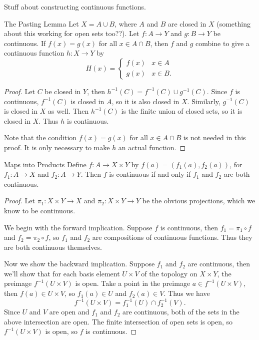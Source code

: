 \documentclass[10pt]{report}
\begin{document}
{\color{red}Stuff about constructing continuous functions.}

\begin{thrm}{The Pasting Lemma}{}
	Let $X = A \cup B$, where $A$ and $B$ are closed in $X$ {\color{red}(something about this working for open sets too??)}. Let $f:A \to Y$ and $g:B\to Y$ be continuous. If $f(x)=g(x)$ for all $x \in A \cap B$, then $f$ and $g$ combine to give a continuous function $h : X \to Y$ by
	\[
		H(x)=
		\begin{cases}
			f(x) & x \in A \\
			g(x) & x\in B.
		\end{cases}
	\] 
\end{thrm}
\begin{proof}
	Let $C$ be closed in $Y$, then $h^{-1}(C) = f^{-1}(C) \cup g^{-1}(C)$. Since $f$ is continuous, $f^{-1}(C)$ is closed in $A$, so it is also closed in $X$. Similarly, $g^{-1}(C)$ is closed in $X$ as well. Then $h^{-1}(C)$ is the finite union of closed sets, so it is closed in $X$. Thus $h$ is continuous.

	Note that the condition $f(x) = g(x)$ for all $x \in A \cap B$ is not needed in this proof. It is only necessary to make $h$ an actual function.
\end{proof}

\begin{thrm}{Maps into Products}{}
	Define $f:A\to X \times Y$ by $f(a)=(f_1(a), f_2(a))$, for $f_1:A\to X$ and $f_2:A\to Y$. Then $f$ is continuous if and only if $f_1$ and $f_2$ are both continuous.
\end{thrm}
\begin{proof}
	Let $\pi_1:X\times Y\to X$ and $\pi_2:X\times Y\to Y$ be the obvious projections, which we know to be continuous.

	We begin with the forward implication. Suppose $f$ is continuous, then $f_1=\pi_1 \circ f$ and $f_2=\pi_2 \circ f$, so $f_1$ and $f_2$ are compositions of continuous functions. Thus they are both continuous themselves.

	Now we show the backward implication. Suppose $f_1$ and $f_2$ are continuous, then we'll show that for each basis element $U \times V$ of the topology on $X \times Y$, the preimage $f^{-1}(U \times V)$ is open. Take a point in the preimage $a \in f^{-1}(U \times V)$, then $f(a) \in U \times V$, so $f_1(a) \in U$ and $f_2(a) \in V$. Thus we have
	\[
		f^{-1}(U \times V) = f_1^{-1}(U) \cap f_2^{-1}(V).
	\] Since $U$ and $V$ are open and $f_1$ and $f_2$ are continuous, both of the sets in the above intersection are open. The finite intersection of open sets is open, so $f^{-1}(U\times V)$ is open, so $f$ is continuous.
\end{proof}
\end{document}
